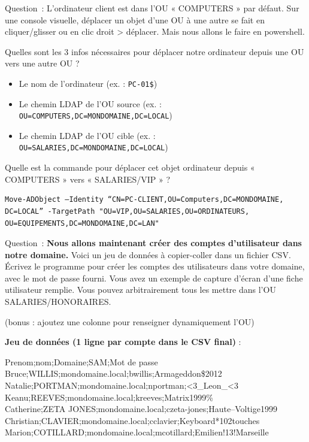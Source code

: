 \vspace{0.5cm}

Question~: L'ordinateur client est dans l'OU « COMPUTERS » par défaut. Sur une console visuelle, déplacer un objet d'une OU à une autre se fait en cliquer/glisser ou en clic droit > déplacer. Mais nous allons le faire en powershell.

\noindent Quelles sont les 3 infos nécessaires pour déplacer notre ordinateur depuis une OU vers une autre OU ?

\begin{itemize}
  \item Le nom de l'ordinateur (ex. : \texttt{PC-01\$})
  \item Le chemin LDAP de l'OU source (ex. : \texttt{OU=COMPUTERS,DC=MONDOMAINE,DC=LOCAL})
  \item Le chemin LDAP de l'OU cible (ex. : \texttt{OU=SALARIES,DC=MONDOMAINE,DC=LOCAL})
\end{itemize}

\vspace{0.5cm}

\noindent Quelle est la commande pour déplacer cet objet ordinateur depuis « COMPUTERS » vers « SALARIES/VIP » ?

\vspace{0.5cm}

\begin{verbatim}
Move-ADObject –Identity “CN=PC-CLIENT,OU=Computers,DC=MONDOMAINE,
DC=LOCAL” -TargetPath "OU=VIP,OU=SALARIES,OU=ORDINATEURS,
OU=EQUIPEMENTS,DC=MONDOMAINE,DC=LAN"
\end{verbatim}

\vspace{0.5cm}

Question~: \textbf{Nous allons maintenant créer des comptes d'utilisateur dans notre domaine.}
\noindent Voici un jeu de données à copier-coller dans un fichier CSV. Écrivez le programme pour créer les comptes des utilisateurs dans votre domaine, avec le mot de passe fourni. Vous avez un exemple de capture d'écran d'une fiche utilisateur remplie.
Vous pouvez arbitrairement tous les mettre dans l'OU SALARIES/HONORAIRES.

\noindent (bonus : ajoutez une colonne pour renseigner dynamiquement l'OU)

\vspace{0.5cm}

\textbf{Jeu de données (1 ligne par compte dans le CSV final)} :

\noindent Prenom;nom;Domaine;SAM;Mot de passe\\
Bruce;WILLIS;mondomaine.local;bwillis;Armageddon\$2012\\
Natalie;PORTMAN;mondomaine.local;nportman;<3\_Leon\_<3\\
Keanu;REEVES;mondomaine.local;kreeves;Matrix1999\%\\
Catherine;ZETA JONES;mondomaine.local;czeta-jones;Haute--Voltige1999\\
Christian;CLAVIER;mondomaine.local;cclavier;Keyboard*102touches\\
Marion;COTILLARD;mondomaine.local;mcotillard;Emilien!13!Marseille\\

